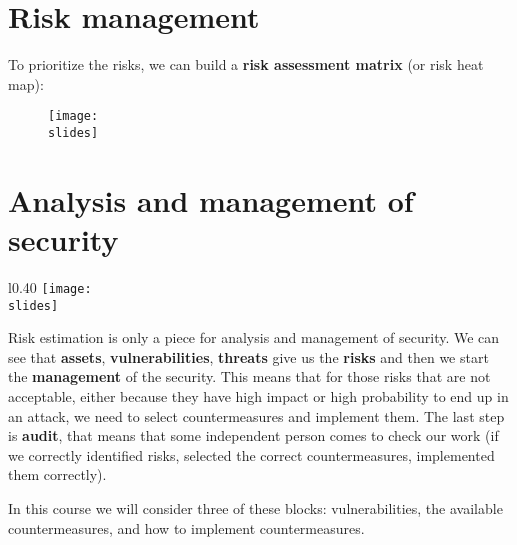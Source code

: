 \section{Risk management}
To prioritize the risks, we can build a \textbf{risk assessment matrix} (or risk heat map):
\begin{figure}[H]
  \texttt{[image: \\slides]}
\end{figure}


\section{Analysis and management of security}

\begin{wrapfigure}{l}{0.40\textwidth}
  \centering
  \texttt{[image: \\slides]}
\end{wrapfigure}
Risk estimation is only a piece for analysis and management of security. We can see that \textbf{assets}, \textbf{vulnerabilities}, \textbf{threats} give us the \textbf{risks} and then we start the \textbf{management} of the security. This means that for those risks that are not acceptable, either because they have high impact or high probability to end up in an attack, we need to select countermeasures and implement them. The last step is \textbf{audit}, that means that some independent person comes to check our work (if we correctly identified risks, selected the correct countermeasures, implemented them correctly).

In this course we will consider three of these blocks: vulnerabilities, the available countermeasures, and how to implement countermeasures.


